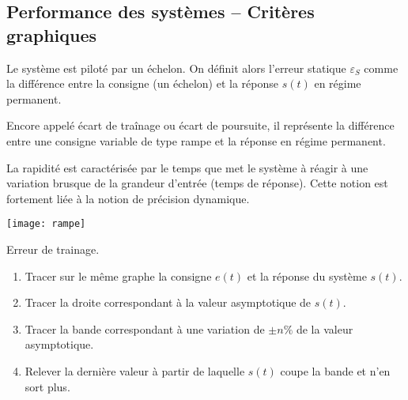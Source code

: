 \vspace{.1cm}

\subsection{Performance des systèmes -- Critères graphiques}

\vspace{.1cm}

\begin{defi}
Le système est piloté par un échelon. On définit alors l'erreur statique $\varepsilon_S$ comme la différence entre la consigne (un échelon) et la réponse $s(t)$ en régime permanent.
\end{defi}

\begin{defi}
Encore appelé écart de traînage ou écart de poursuite, il représente la différence entre une consigne variable de type rampe et la réponse en régime permanent. 
\end{defi}

\begin{defi}[Rapidité]

La rapidité est caractérisée par le temps que met le système à réagir à une
variation brusque de la grandeur d'entrée (temps de réponse). Cette notion est
fortement liée à la notion de précision dynamique.
\end{defi}

\begin{marginfigure}[-2cm]
\texttt{[image: rampe]}
\caption{Erreur de trainage.}
\end{marginfigure}


\begin{methode}%

\begin{enumerate}
 \item Tracer sur le même graphe la consigne $e(t)$ et la réponse du système
$s(t)$.
\item Tracer la droite correspondant à la valeur asymptotique de $s(t)$.
\item Tracer la bande correspondant à une variation de $\pm n\%$ de la valeur
asymptotique.
\item Relever la dernière valeur à partir de laquelle $s(t)$ coupe la bande et
n'en sort plus.
\end{enumerate}
\end{methode}



